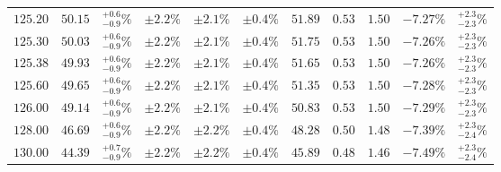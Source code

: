 \begin{table}[ht!]
{{\begin{tabular}{| cc | c | ccc | cccc | c |}
$125.20$ & $50.15$ & $^{+0.6}_{-0.9}\%$ & $\pm 2.2\%$ & {\color{black!55}$\pm 2.1\%$} & {\color{black!55}$\pm 0.4\%$} & $51.89$ & $0.53$ & $1.50$ & $-7.27\%$ & $^{+2.3}_{-2.3}\%$ \\
$125.30$ & $50.03$ & $^{+0.6}_{-0.9}\%$ & $\pm 2.2\%$ & {\color{black!55}$\pm 2.1\%$} & {\color{black!55}$\pm 0.4\%$} & $51.75$ & $0.53$ & $1.50$ & $-7.26\%$ & $^{+2.3}_{-2.3}\%$ \\
$125.38$ & $49.93$ & $^{+0.6}_{-0.9}\%$ & $\pm 2.2\%$ & {\color{black!55}$\pm 2.1\%$} & {\color{black!55}$\pm 0.4\%$} & $51.65$ & $0.53$ & $1.50$ & $-7.26\%$ & $^{+2.3}_{-2.3}\%$ \\
$125.60$ & $49.65$ & $^{+0.6}_{-0.9}\%$ & $\pm 2.2\%$ & {\color{black!55}$\pm 2.1\%$} & {\color{black!55}$\pm 0.4\%$} & $51.35$ & $0.53$ & $1.50$ & $-7.28\%$ & $^{+2.3}_{-2.3}\%$ \\
$126.00$ & $49.14$ & $^{+0.6}_{-0.9}\%$ & $\pm 2.2\%$ & {\color{black!55}$\pm 2.1\%$} & {\color{black!55}$\pm 0.4\%$} & $50.83$ & $0.53$ & $1.50$ & $-7.29\%$ & $^{+2.3}_{-2.3}\%$ \\
$128.00$ & $46.69$ & $^{+0.6}_{-0.9}\%$ & $\pm 2.2\%$ & {\color{black!55}$\pm 2.2\%$} & {\color{black!55}$\pm 0.4\%$} & $48.28$ & $0.50$ & $1.48$ & $-7.39\%$ & $^{+2.3}_{-2.4}\%$ \\
$130.00$ & $44.39$ & $^{+0.7}_{-0.9}\%$ & $\pm 2.2\%$ & {\color{black!55}$\pm 2.2\%$} & {\color{black!55}$\pm 0.4\%$} & $45.89$ & $0.48$ & $1.46$ & $-7.49\%$ & $^{+2.3}_{-2.4}\%$ \\
\cline{1-11}
\end{tabular}
}
}
\end{table}

